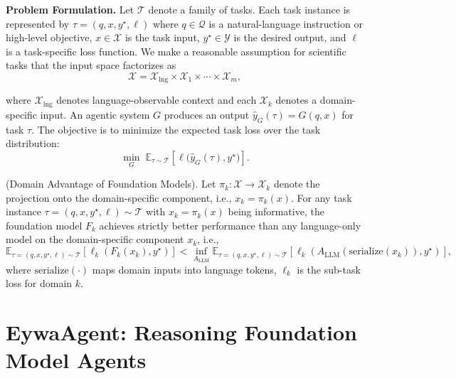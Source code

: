 \documentclass{llmxive}
\begin{document}
{\textbf{Problem Formulation.}
Let $\mathcal{T}$ denote a family of tasks. Each task instance is represented by $\tau = (q, x, y^\star, \ell)$
where $q \in \mathcal{Q}$ is a natural-language instruction or high-level objective, $x \in \mathcal{X}$ is the task input, $y^\star \in \mathcal{Y}$ is the desired output, and $\ell$ is a task-specific loss function.
We make a reasonable assumption for scientific tasks that the input space factorizes as 
\begin{equation}
    \mathcal{X} = \mathcal{X}_{\mathrm{lng}} \times \mathcal{X}_{1} \times \cdots \times \mathcal{X}_{m},
\end{equation}

where $\mathcal{X}_{\mathrm{lng}}$ denotes language-observable context and each $\mathcal{X}_k$ denotes a domain-specific input.
An agentic system $G$ produces an output $\hat{y}_G(\tau) = G(q, x)$ for task $\tau$. The objective is to minimize the expected task loss over the task distribution:
\begin{equation}
    \min_G \; \mathbb{E}_{\tau \sim \mathcal{T}} \left[ \ell\big(\hat{y}_G(\tau), y^\star \big) \right].
\end{equation}


\begin{assumption}\label{assumption: domain advantage}
(Domain Advantage of Foundation Models).
Let $\pi_k : \mathcal{X} \to \mathcal{X}_k$ denote the projection onto the domain-specific component, i.e., $x_k = \pi_k(x)$.
For any task instance $\tau = (q, x, y^\star, \ell) \sim \mathcal{T}$ with $x_k = \pi_k(x)$ being informative, the foundation model $F_k$ achieves strictly better performance than any language-only model on the domain-specific component $x_k$, i.e.,
\begin{equation}
\mathbb{E}_{\tau = (q, x, y^\star, \ell) \sim \mathcal{T}} \left[ \ell_k(F_k(x_k), y^\star) \right]
<
\inf_{A_{\mathrm{LLM}}} 
\mathbb{E}_{\tau = (q, x, y^\star, \ell) \sim \mathcal{T}} \left[ \ell_k(A_{\mathrm{LLM}}(\text{serialize}(x_k)), y^\star) \right],
\end{equation}
where $\text{serialize}(\cdot)$ maps domain inputs into language tokens, $\ell_k$ is the sub-task loss for domain $k$.
\end{assumption}

\section{EywaAgent: Reasoning Foundation Model Agents}
\label{sec:eywaagent}

}
\end{document}
